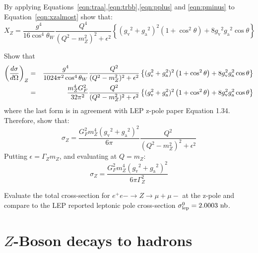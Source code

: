 \documentclass[12pt]{article}
\newcommand{\gv} {\ensuremath{g_{\mathrm v}}}
\newcommand{\ga} {\ensuremath{g_{\mathrm a}}}
\begin{document}
\begin{Exercise}
By applying Equations~\ref{eqn:traa},\ref{eqn:trbb},\ref{eqn:pplus} and \ref{eqn:pminus} to Equation~\ref{eqn:xzalmost} show that:
\begin{equation}
X_Z  = \frac{g^4}{16 \cos^4\theta_W} \frac{Q^4}{(Q^2-m_Z^2)^2 + \epsilon^2} \left\{ (\gv^2 + \ga^2)^2  \left(  1 + \cos^2\theta \right)
+8\gv^2\ga^2 \cos\theta \right\}
\end{equation}
\end{Exercise}

\begin{Exercise}
Show that
\begin{eqnarray}
\left(\frac{d\sigma}{d\Omega}\right)_Z &=& \frac{g^4}{1024\pi^2\cos^4\theta_W} \frac{Q^2}{(Q^2-m_Z^2)^2 + \epsilon^2} \left\{ (\gv^2 + \ga^2)^2  \left(  1 + \cos^2\theta \right)+8\gv^2\ga^2 \cos\theta \right\} \notag \\
&=& \frac{m_Z^4 G_F^2}{32\pi^2} \frac{Q^2}{(Q^2-m_Z^2)^2 + \epsilon^2} \left\{ (\gv^2 + \ga^2)^2  \left(  1 + \cos^2\theta \right)+8\gv^2\ga^2 \cos\theta \right\} \label{eqn:dsigmaz}
\end{eqnarray}
where the last form is in agreement with LEP z-pole paper Equation 1.34.  Therefore, show that:
\begin{equation}
\sigma_Z = \frac{G_F^2 m_Z^4(\gv^2 + \ga^2)^2}{6\pi} \frac{Q^2}{(Q^2-m_Z^2)^2 + \epsilon^2}
\end{equation}
Putting $\epsilon = \Gamma_Z m_Z$, and evaluating at $Q=m_Z$:
\begin{equation}
\sigma_Z  = \frac{G_F^2 m_Z^4(\gv^2 + \ga^2)^2}{6\pi\Gamma_Z^2} 
\end{equation}
\end{Exercise}

\begin{Exercise}
Evaluate the total cross-section for $e^+e- \to Z \to \mu+\mu-$ at the z-pole and compare to the LEP reported leptonic pole cross-section $\sigma_{\rm lep}^0 = 2.0003~{\rm nb}$.

\end{Exercise}

\section{$Z$-Boson decays to hadrons}
\end{document}
